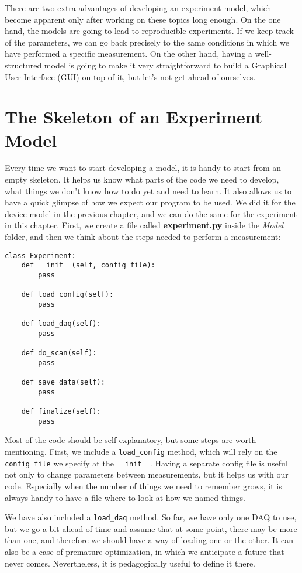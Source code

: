 There are two extra advantages of developing an experiment model, which become apparent only after working on these topics long enough. On the one hand, the models are going to lead to reproducible experiments. If we keep track of the parameters, we can go back precisely to the same conditions in which we have performed a specific measurement. On the other hand, having a well-structured model is going to make it very straightforward to build a Graphical User Interface ({GUI}) on top of it, but let's not get ahead of ourselves.

\section{The Skeleton of an Experiment Model}\label{sec:skeleton-experiment-model}
Every time we want to start developing a model, it is handy to start from an empty skeleton. It helps us know what parts of the code we need to develop, what things we don't know how to do yet and need to learn. It also allows us to have a quick glimpse of how we expect our program to be used. We did it for the device model in the previous chapter, and we can do the same for the experiment in this chapter. First, we create a file called \textbf{experiment.py} inside the \emph{Model} folder, and then we think about the steps needed to perform a measurement:

\begin{verbatim}
class Experiment:
    def __init__(self, config_file):
        pass

    def load_config(self):
        pass

    def load_daq(self):
        pass

    def do_scan(self):
        pass

    def save_data(self):
        pass

    def finalize(self):
        pass

\end{verbatim}

Most of the code should be self-explanatory, but some steps are worth mentioning. First, we include a \texttt{load\_config} method, which will rely on the \texttt{config\_file} we specify at the \texttt{\_\_init\_\_}. Having a separate config file is useful not only to change parameters between measurements, but it helps us with our code. Especially when the number of things we need to remember grows, it is always handy to have a file where to look at how we named things.

We have also included a \texttt{load\_daq} method. So far, we have only one DAQ to use, but we go a bit ahead of time and assume that at some point, there may be more than one, and therefore we should have a way of loading one or the other. It can also be a case of premature optimization, in which we anticipate a future that never comes. Nevertheless, it is pedagogically useful to define it there.

